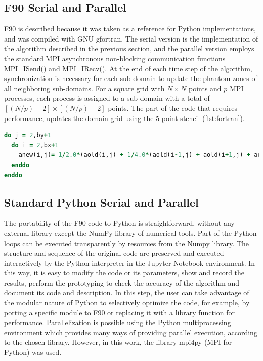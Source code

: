 \documentclass[12pt]{article}
\begin{document}
\subsection{F90 Serial and Parallel}

F90 is described because it was taken as a reference for Python implementations, and was compiled with GNU gfortran. The serial version is the implementation of the algorithm described in the previous section, and the parallel version employs the standard MPI asynchronous non-blocking communication functions MPI\_ISend() and MPI\_IRecv(). At the end of each time step of the algorithm, synchronization is necessary for each sub-domain to update the phantom zones of all neighboring sub-domains. For a square grid with $ N \times N $ points and $ p $ MPI processes, each process is assigned to a sub-domain with a total of $ [(N / p) +2] \times [(N / p) +2 ] $ points. The part of the code that requires performance, updates the domain grid using the 5-point stencil (\autoref{lst:fortran}).

\begin{lstlisting}[language=Fortran, label=lst:fortran, caption={Time-consuming part of the F90 code of the test problem}]
do j = 2,by+1
  do i = 2,bx+1
    anew(i,j)= 1/2.0*(aold(i,j) + 1/4.0*(aold(i-1,j) + aold(i+1,j) + aold(i,j-1) + aold(i,j+1)))
  enddo
enddo
\end{lstlisting}




\subsection{Standard Python Serial and Parallel}

The portability of the F90 code to Python is straightforward, without any external library except the NumPy library of numerical tools. Part of the Python loops can be executed transparently by resources from the Numpy library. The structure and sequence of the original code are preserved and executed interactively by the Python interpreter in the Jupyter Notebook environment. In this way, it is easy to modify the code or its parameters, show and record the results, perform the prototyping to check the accuracy of the algorithm and document its code and description. In this step, the user can take advantage of the modular nature of Python to selectively optimize the code, for example, by porting a specific module to F90 or replacing it with a library function for performance. Parallelization is possible using the Python multiprocessing environment which provides many ways of providing parallel execution, according to the chosen library. However, in this work, the library mpi4py (MPI for Python) was used.
\end{document}
